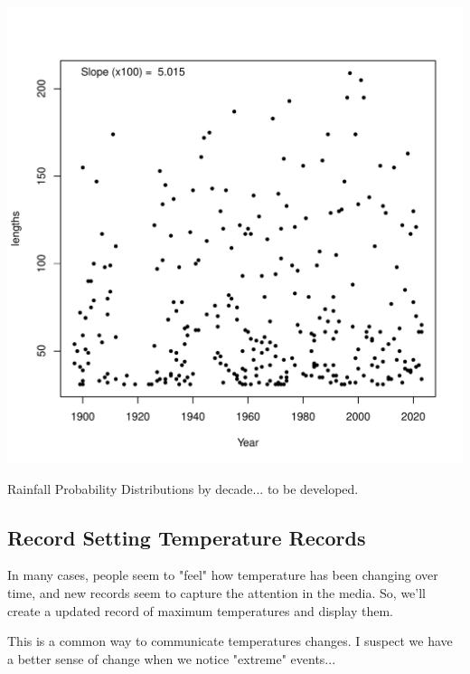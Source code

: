 \documentclass{article}
\begin{document}
\begin{itemize}
\begin{knitrout}
\begin{kframe}
{\ttfamily\noindent\bfseries\color{errorcolor}{\#\# Error in h(simpleError(msg, call)): error in evaluating the argument 'object' in selecting a method for function 'summary': object 'Drought.run.100' not found}}\end{kframe}
\includegraphics[width=\maxwidth]{figure/unnamed-chunk-10-2} 
\end{knitrout}

Rainfall Probability Distributions by decade... to be developed.





\subsection{Record Setting Temperature Records}

In many cases, people seem to "feel" how temperature has been changing over time, and new records seem to capture the attention in the media. So, we'll create a updated record of maximum temperatures and display them. 





This is a common way to communicate temperatures changes. I suspect we have a better sense of change when we notice "extreme" events...







\end{itemize}
\end{document}
